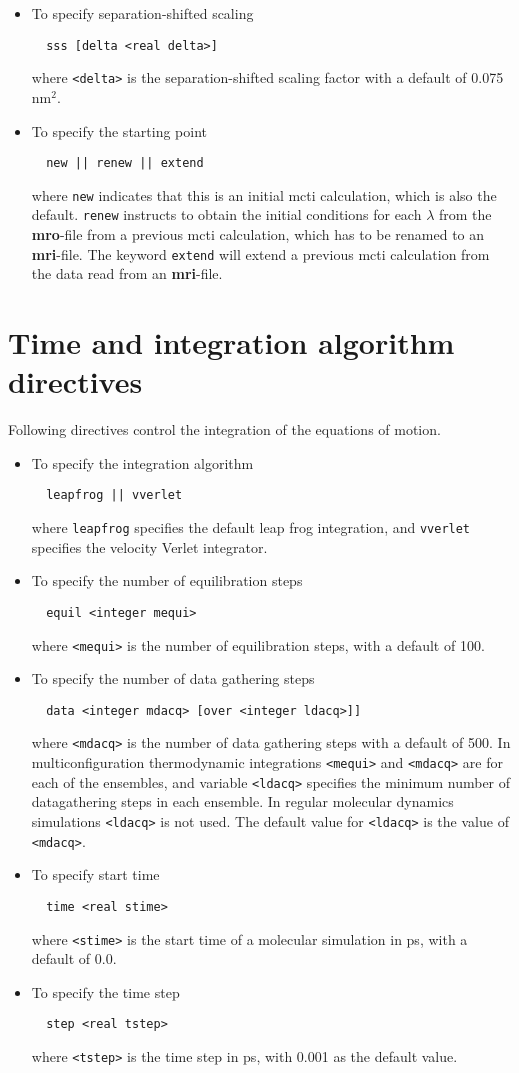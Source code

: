 \begin{itemize}
\item
To specify separation-shifted scaling
\begin{verbatim}
  sss [delta <real delta>]
\end{verbatim}
where \verb+<delta>+ is the separation-shifted scaling factor with a default
of 0.075 nm$^2$.
\item
To specify the starting point
\begin{verbatim}
  new || renew || extend
\end{verbatim}
where {\tt new} indicates that this is an initial mcti calculation, which
is also the default. {\tt renew} instructs to obtain the initial
conditions for each $\lambda$ from the {\bf mro}-file from a previous 
mcti calculation, which has to be renamed to an {\bf mri}-file. The
keyword {\tt extend} will extend a previous mcti calculation from the
data read from an {\bf mri}-file.
\end{itemize}

\section{Time and integration algorithm directives}
Following directives control the integration of the equations of motion.
\begin{itemize}
\item
To specify the integration algorithm
\begin{verbatim}
  leapfrog || vverlet
\end{verbatim}
where {\tt leapfrog} specifies the default leap frog integration, and
{\tt vverlet} specifies the velocity Verlet integrator.
\item
To specify the number of equilibration steps
\begin{verbatim}
  equil <integer mequi>
\end{verbatim}
where \verb+<mequi>+ is the number of equilibration steps, with a default
of 100.
\item
To specify the number of data gathering steps
\begin{verbatim}
  data <integer mdacq> [over <integer ldacq>]]
\end{verbatim}
where \verb+<mdacq>+ is the number of data gathering steps with a
default of 500. In multiconfiguration thermodynamic integrations
\verb+<mequi>+ and \verb+<mdacq>+ are for each of the ensembles, and
variable \verb+<ldacq>+ specifies the minimum number of datagathering steps 
in each ensemble. In regular molecular dynamics simulations \verb+<ldacq>+
is not used. The default value for \verb+<ldacq>+ is the value of \verb+<mdacq>+.
\item
To specify start time
\begin{verbatim}
  time <real stime>
\end{verbatim}
where \verb+<stime>+ is the start time of a molecular simulation in ps,
with a default of 0.0.
\item
To specify the time step
\begin{verbatim}
  step <real tstep>
\end{verbatim}
where \verb+<tstep>+ is the time step in ps, with 0.001 as the default value.
\end{itemize}

